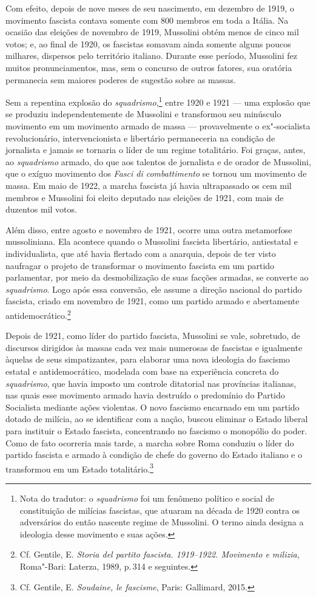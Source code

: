 Com efeito, depois de nove meses de seu nascimento, em dezembro de 1919,
o movimento fascista contava somente com 800 membros em toda a Itália.
Na ocasião das eleições de novembro de 1919, Mussolini obtém menos de
cinco mil votos; e, ao final de 1920, os fascistas somavam ainda somente
alguns poucos milhares, dispersos pelo território italiano. Durante esse
período, Mussolini fez muitos pronunciamentos, mas, sem o concurso de
outros fatores, sua oratória permanecia sem maiores poderes de sugestão
sobre as massas.

Sem a repentina explosão do \emph{squadrismo},\footnote{Nota do tradutor:
  o \emph{squadrismo} foi um fenômeno político e social de constituição
  de milícias fascistas, que atuaram na década de 1920 contra os
  adversários do então nascente regime de Mussolini. O termo ainda
  designa a ideologia desse movimento e suas ações.} entre 1920 e 1921
--- uma explosão que se produziu independentemente de Mussolini e
transformou seu minúsculo movimento em um movimento armado de massa ---
provavelmente o ex"-socialista revolucionário, intervencionista e
libertário permaneceria na condição de jornalista e jamais se tornaria o
líder de um regime totalitário. Foi graças, antes, ao \emph{squadrismo}
armado, do que aos talentos de jornalista e de orador de Mussolini, que
o exíguo movimento dos \emph{Fasci di combattimento} se tornou um
movimento de massa. Em maio de 1922, a marcha fascista já havia
ultrapassado os cem mil membros e Mussolini foi eleito deputado nas
eleições de 1921, com mais de duzentos mil votos.

Além disso, entre agosto e novembro de 1921, ocorre uma outra
metamorfose mussoliniana. Ela acontece quando o Mussolini fascista
libertário, antiestatal e individualista, que até havia flertado com a
anarquia, depois de ter visto naufragar o projeto de transformar o
movimento fascista em um partido parlamentar, por meio da desmobilização
de suas facções armadas, se converte ao \emph{squadrismo}. Logo após
essa conversão, ele assume a direção nacional do partido fascista,
criado em novembro de 1921, como um partido armado e abertamente
antidemocrático.\footnote{Cf. Gentile, E. \emph{Storia del partito
  fascista. 1919--1922. Movimento e milizia}, Roma"-Bari: Laterza, 1989,
  p.\,314 e seguintes.}

Depois de 1921, como líder do partido fascista, Mussolini se vale,
sobretudo, de discursos dirigidos às massas cada vez mais numerosas de
fascistas e igualmente àquelas de seus simpatizantes, para elaborar uma
nova ideologia do fascismo estatal e antidemocrático, modelada com base
na experiência concreta do \emph{squadrismo}, que havia imposto um
controle ditatorial nas províncias italianas, nas quais esse movimento
armado havia destruído o predomínio do Partido Socialista mediante ações
violentas. O novo fascismo encarnado em um partido dotado de milícia, ao
se identificar com a nação, buscou eliminar o Estado liberal para
instituir o Estado fascista, concentrando no fascismo o monopólio do
poder. Como de fato ocorreria mais tarde, a marcha sobre Roma conduziu o
líder do partido fascista e armado à condição de chefe do governo do
Estado italiano e o transformou em um Estado totalitário.\footnote{Cf.
  Gentile, E. \emph{Soudaine, le fascisme}, Paris: Gallimard, 2015.}

